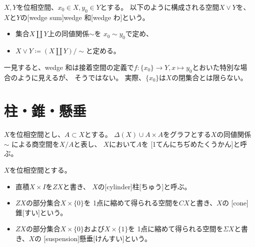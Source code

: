 \documentclass[report]{jlreq}
\begin{document}

\begin{definition}[wedge 和]
    $X, Y$を位相空間、$x_0 \in X, y_0 \in Y$とする。
    以下のように構成される空間$X \vee Y$を、
    $X$と$Y$の[wedge sum]{wedge 和}[wedge わ]という。
    \begin{itemize}
        \item 集合$X \amalg Y$上の同値関係$\sim$を
            $x_0 \sim y_0$で定め、
        \item $X \vee Y \coloneqq (X \amalg Y) / \sim$と定める。
    \end{itemize}
\end{definition}

\begin{remark}
    一見すると、wedge 和は接着空間の定義で$f \colon \{x_0\} \to Y, x \mapsto y_0$とおいた特別な場合のように見えるが、
    そうではない。
    実際、$\{x_0\}$は$X$の閉集合とは限らない。
\end{remark}

%
\section{柱・錐・懸垂}

\begin{definition}[1点に縮めた空間]
    $X$を位相空間とし、$A \subset X$とする。
    $\Delta(X) \cup A \times A$をグラフとする$X$の同値関係$\sim$\footnotemark
    による商空間を$X/A$と表し、
    $X$において$A$を
    [1てんにちぢめたくうかん]と呼ぶ。
\end{definition}


\begin{definition}[柱、錐、懸垂]
    $X$を位相空間とする。
    \begin{itemize}
        \item 直積$X \times I$を$ZX$と書き、
            $X$の[cylinder]{柱}[ちゅう]と呼ぶ。
        \item $ZX$の部分集合$X \times \{0\}$を
            1点に縮めて得られる空間を$CX$と書き、$X$の
            [cone]{錐}[すい]という。
        \item $ZX$の部分集合$X \times \{0\}$および$X \times \{1\}$を
            1点に縮めて得られる空間を$\Sigma X$と書き、$X$の
            [suspension]{懸垂}[けんすい]という。
    \end{itemize}
\end{definition}
\end{document}

